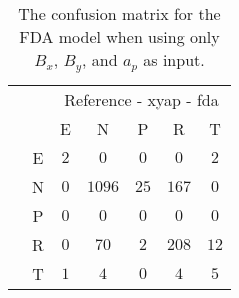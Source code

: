 \begin{table}[!ht]
	\centering
	\begin{tabular}{|c|c|c|c|c|c|c|}
		\cline{3-7}
		\multicolumn{2}{c|}{} & \multicolumn{5}{|c|}{Reference - xyap - fda} \\ \cline{3-7}
		\multicolumn{2}{c|}{} & E & N & P & R & T \\ \hline
		\multirow{5}{*}{\rotatebox{90}{Prediction}} & E & $2$ & $0$ & $0$ & $0$ & $2$ \\ \cline{2-7}
		 & N & $0$ & $1096$ & $25$ & $167$ & $0$ \\ \cline{2-7}
		 & P & $0$ & $0$ & $0$ & $0$ & $0$ \\ \cline{2-7}
		 & R & $0$ & $70$ & $2$ & $208$ & $12$ \\ \cline{2-7}
		 & T & $1$ & $4$ & $0$ & $4$ & $5$ \\ \hline
	\end{tabular}
	\caption{The confusion matrix for the FDA model when using only $B_{x}$, $B_{y}$, and $a_{p}$ as input.}
	\label{tab:cm:xyap:fda}
\end{table}
